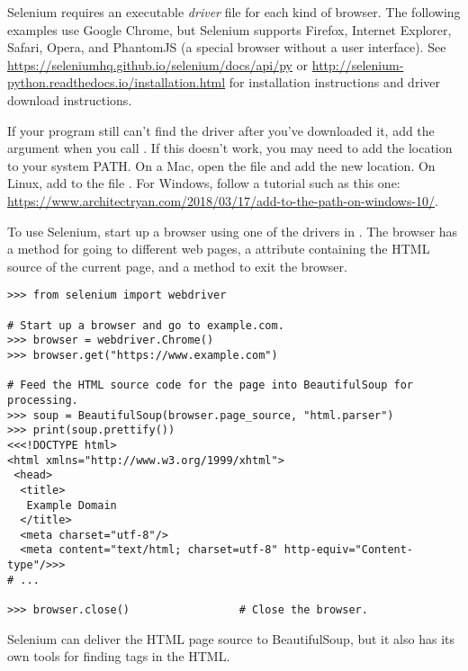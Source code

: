 \begin{info} %
Selenium requires an executable \emph{driver} file for each kind of browser.
The following examples use Google Chrome, but Selenium supports Firefox, Internet Explorer, Safari, Opera, and PhantomJS (a special browser without a user interface).
See \url{https://seleniumhq.github.io/selenium/docs/api/py} or \url{http://selenium-python.readthedocs.io/installation.html} for installation instructions and driver download instructions.

If your program still can't find the driver after you've downloaded it, add the argument  when you call .
If this doesn't work, you may need to add the location to your system PATH.
On a Mac, open the file  and add the new location.
On Linux, add  to the file  .
For Windows, follow a tutorial such as this one: \url{https://www.architectryan.com/2018/03/17/add-to-the-path-on-windows-10/}.
\end{info}

To use Selenium, start up a browser using one of the drivers in .
The browser has a  method for going to different web pages, a  attribute containing the HTML source of the current page, and a  method to exit the browser.

\begin{lstlisting}
>>> from selenium import webdriver

# Start up a browser and go to example.com.
>>> browser = webdriver.Chrome()
>>> browser.get("https://www.example.com")

# Feed the HTML source code for the page into BeautifulSoup for processing.
>>> soup = BeautifulSoup(browser.page_source, "html.parser")
>>> print(soup.prettify())
<<<!DOCTYPE html>
<html xmlns="http://www.w3.org/1999/xhtml">
 <head>
  <title>
   Example Domain
  </title>
  <meta charset="utf-8"/>
  <meta content="text/html; charset=utf-8" http-equiv="Content-type"/>>>
# ...

>>> browser.close()                 # Close the browser.
\end{lstlisting}


Selenium can deliver the HTML page source to BeautifulSoup, but it also has its own tools for finding tags in the HTML.

